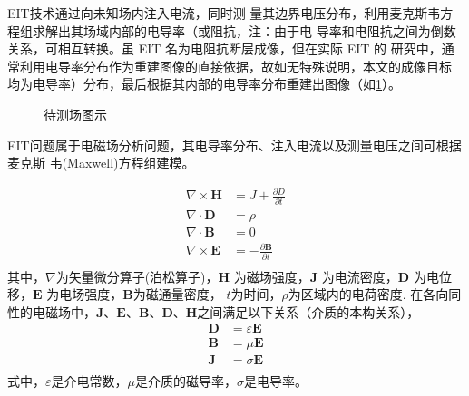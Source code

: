 EIT技术通过向未知场内注入电流，同时测
量其边界电压分布，利用麦克斯韦方程组求解出其场域内部的电导率（或阻抗，注：由于电
导率和电阻抗之间为倒数关系，可相互转换。虽 EIT 名为电阻抗断层成像，但在实际 EIT 的
研究中，通常利用电导率分布作为重建图像的直接依据，故如无特殊说明，本文的成像目标
均为电导率）分布，最后根据其内部的电导率分布重建出图像（如\cref{figure:eeeee}）。

\begin{figure}[h]
  
  \centering

\caption{待测场图示}
\label{figure:eeeee}

\end{figure}



EIT问题属于电磁场分析问题，其电导率分布、注入电流以及测量电压之间可根据麦克斯
韦(Maxwell)方程组建模。

\begin{equation}
\label{equation:Maxwell}
    \begin{aligned}
        \nabla \times \boldsymbol{H} &= J + \frac{\partial{D}}{\partial{t}} \\
        \nabla \cdot \boldsymbol{D} &= \rho \\
        \nabla \cdot \boldsymbol{B} &= 0 \\
        \nabla \times\boldsymbol{E} &= -\frac{\partial \boldsymbol{B}}{\partial t} \\   
    \end{aligned}
\end{equation}
其中，$\nabla$为矢量微分算子(泊松算子)，$\boldsymbol{H}$ 为磁场强度，$\boldsymbol{J}$ 为电流密度，$\boldsymbol{D}$
为电位移，$\boldsymbol{E}$ 为电场强度，$\boldsymbol{B}$为磁通量密度， $t$为时间，$\rho$为区域内的电荷密度.
在各向同性的电磁场中，$\boldsymbol{J}$、$\boldsymbol{E}$、$\boldsymbol{B}$、$\boldsymbol{D}$、$\boldsymbol{H}$之间满足以下关系（介质的本构关系），
\begin{equation}
  \label{equation:Maxwell_relation}
  \begin{aligned}
    \boldsymbol{D} &= \varepsilon\boldsymbol{E}\\
    \boldsymbol{B} & = \mu\boldsymbol{E}\\
    \boldsymbol{J} & = \sigma\boldsymbol{E}\\
  \end{aligned}
\end{equation}
式中，$\varepsilon$是介电常数，$\mu$是介质的磁导率，$\sigma$是电导率。

